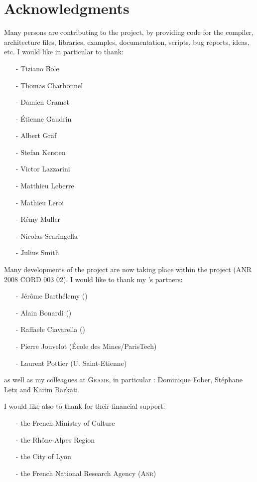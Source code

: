 \documentclass[a4paper]{book}
\begin{document}
\chapter{Acknowledgments}
Many persons are contributing to the \faust project, by providing code for the compiler, architecture files, libraries, examples, documentation, scripts, bug reports, ideas, etc. I would like in particular to thank:

\begin{itemize}
\item[-]Tiziano Bole	
\item[-]Thomas Charbonnel
\item[-]Damien Cramet
\item[-]\'Etienne Gaudrin
\item[-]Albert Gr\"af
\item[-]Stefan Kersten
\item[-]Victor Lazzarini
\item[-]Matthieu Leberre
\item[-]Mathieu Leroi
\item[-]R\'emy Muller
\item[-]Nicolas Scaringella
\item[-]Julius Smith
\end{itemize}


Many developments of the \faust project are now taking place within the \astree project (ANR 2008 CORD 003 02). I would like to thank my \astree's partners:
\begin{itemize}
\item[-]J\'er\^ome Barth\'elemy (\ircam)
\item[-]Alain Bonardi (\ircam)
\item[-]Raffaele Ciavarella (\ircam)
\item[-]Pierre Jouvelot (\'Ecole des Mines/ParisTech)
\item[-]Laurent Pottier (U. Saint-Etienne)
\end{itemize}
as well as my colleagues at \textsc{Grame}, in particular : Dominique Fober, St\'ephane Letz and Karim Barkati.


I would like also to thank for their financial support:
\begin{itemize}
\item[-]the French Ministry of Culture
\item[-]the Rh\^one-Alpes Region
\item[-]the City of Lyon
\item[-]the French National Research Agency (\textsc{Anr})
\end{itemize}




\end{document}
